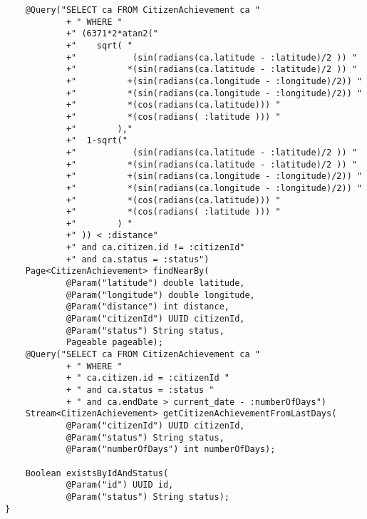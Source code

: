\begin {lstlisting}
	@Query("SELECT ca FROM CitizenAchievement ca "
			+ " WHERE "
			+" (6371*2*atan2("
			+"	  sqrt( "
			+"			 (sin(radians(ca.latitude - :latitude)/2 )) "
			+" 		    *(sin(radians(ca.latitude - :latitude)/2 )) "
			+" 		    +(sin(radians(ca.longitude - :longitude)/2)) " 
			+"			*(sin(radians(ca.longitude - :longitude)/2)) "
			+"			*(cos(radians(ca.latitude))) "
			+"			*(cos(radians( :latitude ))) "
			+"		  ),"
			+"	1-sqrt("
			+"			 (sin(radians(ca.latitude - :latitude)/2 )) "
			+"			*(sin(radians(ca.latitude - :latitude)/2 )) "						
			+"          +(sin(radians(ca.longitude - :longitude)/2)) " 
			+"			*(sin(radians(ca.longitude - :longitude)/2)) " 
			+"			*(cos(radians(ca.latitude))) "
			+"			*(cos(radians( :latitude ))) "
			+"	      ) "
			+" )) < :distance"
			+" and ca.citizen.id != :citizenId"
			+" and ca.status = :status")
	Page<CitizenAchievement> findNearBy(
			@Param("latitude") double latitude, 
			@Param("longitude") double longitude,
			@Param("distance") int distance,
			@Param("citizenId") UUID citizenId,
			@Param("status") String status,
			Pageable pageable);
	@Query("SELECT ca FROM CitizenAchievement ca "
			+ " WHERE "
			+ " ca.citizen.id = :citizenId "
			+ " and ca.status = :status "
			+ " and ca.endDate > current_date - :numberOfDays")
	Stream<CitizenAchievement> getCitizenAchievementFromLastDays(
			@Param("citizenId") UUID citizenId,
			@Param("status") String status,
			@Param("numberOfDays") int numberOfDays);
	
	Boolean existsByIdAndStatus(
			@Param("id") UUID id,
			@Param("status") String status);
}
\end{lstlisting}

